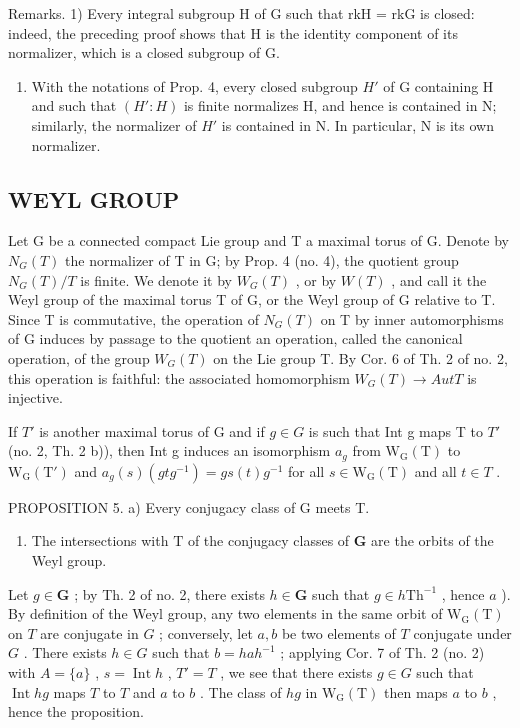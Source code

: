 Remarks. 1) Every integral subgroup H of G such that rkH = rkG is closed: indeed, the preceding proof shows that H is the identity component of its normalizer, which is a closed subgroup of G.

\begin{enumerate}
\def\labelenumi{\arabic{enumi})}
\setcounter{enumi}{1}
\tightlist
\item
  With the notations of Prop. 4, every closed subgroup \(H'\) of G containing H and such that \((H':H)\) is finite normalizes H, and hence is contained in N; similarly, the normalizer of \(H'\) is contained in N. In particular, N is its own normalizer.
\end{enumerate}

\subsection{WEYL GROUP}

Let G be a connected compact Lie group and T a maximal torus of G. Denote by \(N_{G}(T)\) the normalizer of T in G; by Prop. 4 (no. 4), the quotient group \(N_{G}(T)/T\) is finite. We denote it by \(W_{G}(T)\) , or by \(W(T)\) , and call it the Weyl group of the maximal torus T of G, or the Weyl group of G relative to T. Since T is commutative, the operation of \(N_{G}(T)\) on T by inner automorphisms of G induces by passage to the quotient an operation, called the canonical operation, of the group \(W_{G}(T)\) on the Lie group T. By Cor. 6 of Th. 2 of no. 2, this operation is faithful: the associated homomorphism \(W_{G}(T) \rightarrow Aut T\) is injective.

If \(T'\) is another maximal torus of G and if \(g \in G\) is such that Int g maps T to \(T'\) (no. 2, Th. 2 b)), then Int g induces an isomorphism \(a_g\) from \(\mathrm{W}_{\mathrm{G}}(\mathrm{T})\) to \(\mathrm{W}_{\mathrm{G}}(\mathrm{T}')\) and \(a_g(s)(gtg^{-1}) = gs(t)g^{-1}\) for all \(s \in \mathrm{W}_{\mathrm{G}}(\mathrm{T})\) and all \(t \in T\) .

PROPOSITION 5. a) Every conjugacy class of G meets T.

\begin{enumerate}
\def\labelenumi{\alph{enumi})}
\setcounter{enumi}{1}
\tightlist
\item
  The intersections with \(\mathrm{T}\) of the conjugacy classes of \(\mathbf{G}\) are the orbits of the Weyl group.
\end{enumerate}

Let \(g \in \mathbf{G}\) ; by Th. 2 of no. 2, there exists \(h \in \mathbf{G}\) such that \(g \in h\mathrm{Th}^{-1}\) , hence \(a\) ). By definition of the Weyl group, any two elements in the same orbit of \(\mathrm{W_G(T)}\) on \(T\) are conjugate in \(G\) ; conversely, let \(a, b\) be two elements of \(T\) conjugate under \(G\) . There exists \(h \in G\) such that \(b = hah^{-1}\) ; applying Cor. 7 of Th. 2 (no. 2) with \(A = \{a\}\) , \(s = \operatorname{Int} h\) , \(T' = T\) , we see that there exists \(g \in G\) such that \(\operatorname{Int} hg\) maps \(T\) to \(T\) and \(a\) to \(b\) . The class of \(hg\) in \(\mathrm{W_G(T)}\) then maps \(a\) to \(b\) , hence the proposition.

